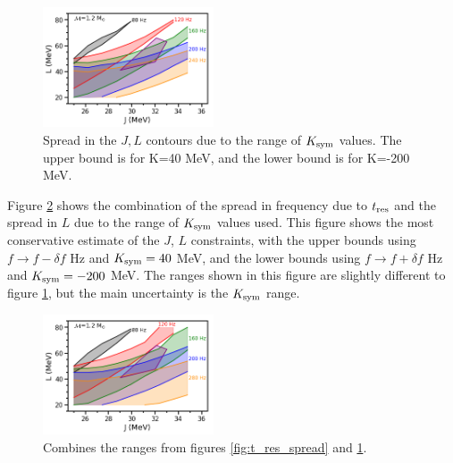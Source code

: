 \documentclass[fleqn,usenatbib]{mnras}
\begin{document}
\begin{figure}
\centering
\includegraphics[width=0.45\textwidth,angle=0]{JL_spread_due_to_Ksym_grid.png}
\caption{Spread in the $J,L$ contours due to the range of $K_{\rm sym}$ values. The upper bound is for K=40 MeV, and the lower bound is for K=-200 MeV.}
\label{fig:constraints}
\end{figure}

Figure \ref{fig:all_constraints} shows the combination of the spread in frequency due to $t_{\rm res}$ and the spread in $L$ due to the range of $K_{\rm sym}$ values used. This figure shows the most conservative estimate of the $J$, $L$ constraints, with the upper bounds using $f\rightarrow f-\delta f$ Hz and $K_{\rm sym}=40$ MeV, and the lower bounds using $f\rightarrow f+\delta f$ Hz and $K_{\rm sym}=-200$ MeV. The ranges shown in this figure are slightly different to figure \ref{fig:constraints}, but the main uncertainty is the $K_{\rm sym}$ range.




\begin{figure}
\centering
\includegraphics[width=0.45\textwidth,angle=0]{JL_spread_due_to_Ksym_and_df_grid_280.png}
\caption{Combines the ranges from figures \ref{fig:t_res_spread} and \ref{fig:constraints}.}
\label{fig:all_constraints}
\end{figure}


\fi
\end{document}
